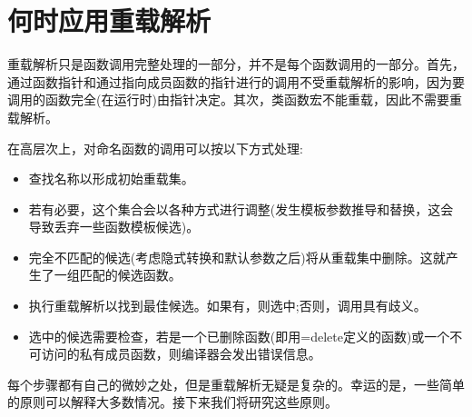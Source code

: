 \section{何时应用重载解析}
重载解析只是函数调用完整处理的一部分，并不是每个函数调用的一部分。首先，通过函数指针和通过指向成员函数的指针进行的调用不受重载解析的影响，因为要调用的函数完全(在运行时)由指针决定。其次，类函数宏不能重载，因此不需要重载解析。

在高层次上，对命名函数的调用可以按以下方式处理:

\begin{itemize}
\item 
查找名称以形成初始重载集。

\item 
若有必要，这个集合会以各种方式进行调整(发生模板参数推导和替换，这会导致丢弃一些函数模板候选)。

\item 
完全不匹配的候选(考虑隐式转换和默认参数之后)将从重载集中删除。这就产生了一组匹配的候选函数。

\item 
执行重载解析以找到最佳候选。如果有，则选中;否则，调用具有歧义。

\item 
选中的候选需要检查，若是一个已删除函数(即用=delete定义的函数)或一个不可访问的私有成员函数，则编译器会发出错误信息。
\end{itemize}

每个步骤都有自己的微妙之处，但是重载解析无疑是复杂的。幸运的是，一些简单的原则可以解释大多数情况。接下来我们将研究这些原则。














































